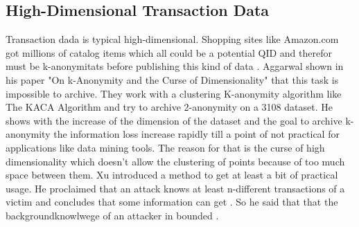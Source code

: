 \documentclass{llncs}
\begin{document}
\subsection{High-Dimensional Transaction Data}

Transaction dada is typical high-dimensional. Shopping sites like Amazon.com got millions of catalog items which all could be a potential QID and therefor must be k-anonymitats before publishing this kind of data \cite{wang2010privacy}. Aggarwal shown in his paper "On k-Anonymity and the Curse of Dimensionality" that this task is impossible to archive. They work with a clustering K-anonymity algorithm like The KACA Algorithm and try to archive 2-anonymity on a 3108 dataset. He shows with the increase of the dimension of the dataset and the goal to archive k-anonymity the information loss increase rapidly till a point of not practical for applications like data mining tools.  The reason for that is the curse of high dimensionality which doesn't allow the clustering of points because of too much space between them. Xu introduced a method to get at least a bit of practical usage. He proclaimed that an attack knows at least n-different transactions of a victim and concludes that some information can get \cite{xu2008publishing}. So he said that that the backgroundknowlwege of an attacker in bounded \cite{aggarwal2005k}. 

\end{document}
